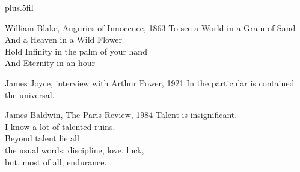 \begin{epigraph}
\vskip0pt plus.5fil
\setsinglespacing

\begin{epiquote}{William Blake, Auguries of Innocence, 1863}
    To see a World in a Grain of Sand \\
    And a Heaven in a Wild Flower \\
    Hold Infinity in the palm of your hand \\
    And Eternity in an hour
\end{epiquote}

\begin{epiquote}{James Joyce, interview with Arthur Power, 1921}
    In the particular is contained the universal.
\end{epiquote}

\begin{epiquote}{James Baldwin, The Paris Review, 1984}
    Talent is insignificant. \\
    I know a lot of talented ruins. \\
    Beyond talent lie all \\
    the usual words: discipline, love, luck, \\ 
    but, most of all, endurance.
\end{epiquote}

\end{epigraph}
